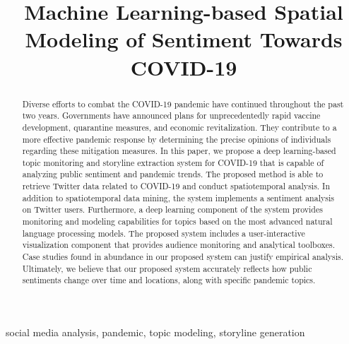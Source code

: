 \documentclass[conference]{IEEEtran}
\begin{document}
\title{Machine Learning-based Spatial Modeling of Sentiment Towards COVID-19}

\author{
}

\maketitle

\begin{abstract} 
Diverse efforts to combat the COVID-19 pandemic have continued throughout the
past two years. Governments have announced plans for unprecedentedly rapid
vaccine development, quarantine measures, and economic revitalization. They
contribute to a more effective pandemic response by determining the precise
opinions of individuals regarding these mitigation measures. In this paper,
we propose a deep learning-based topic monitoring and storyline extraction
system for COVID-19 that is capable of analyzing public sentiment and
pandemic trends. The proposed method is able to retrieve Twitter data related
to COVID-19 and conduct spatiotemporal analysis. In addition to
spatiotemporal data mining, the system implements a sentiment analysis on
Twitter users. Furthermore, a deep learning component of the system provides
monitoring and modeling capabilities for topics based on the most advanced
natural language processing models. The proposed system includes a
user-interactive visualization component that provides audience monitoring
and analytical toolboxes. Case studies found in abundance in our proposed
system can justify empirical analysis. Ultimately, we believe that our
proposed system accurately reflects how public sentiments change over time
and locations, along with specific pandemic topics. 
 \end{abstract}
\begin{IEEEkeywords}
social media analysis, pandemic, topic modeling, storyline generation
\end{IEEEkeywords}


% 







\end{document}
